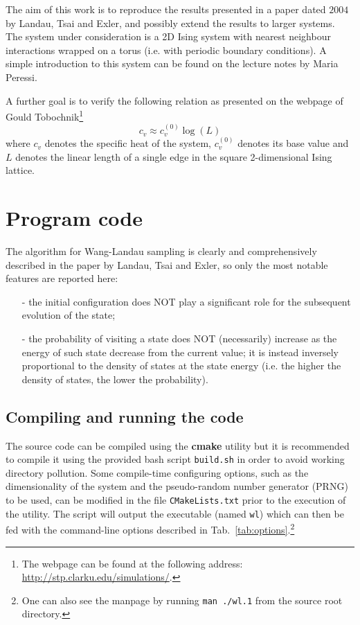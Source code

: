 \documentclass[11pt]{article}
\newcommand{\tabname}{Tab.~}
\begin{document}
The aim of this work is to reproduce the results presented in a paper dated $2004$ by Landau, Tsai and Exler\cite{bib:wang_landau}, and possibly extend the results to larger systems. The system under consideration is a 2D Ising system with nearest neighbour interactions wrapped on a torus (i.e. with periodic boundary conditions). A simple introduction to this system can be found on the lecture notes by Maria Peressi\cite{bib:lect_notes}.

A further goal is to verify the following relation as presented on the webpage of Gould Tobochnik\cite{bib:problem}\footnote{The webpage can be found at the following address: \url{http://stp.clarku.edu/simulations/}.}
\[
	c_v \approx c_v^{(0)}\log{(L)}
\]
where $c_v$ denotes the specific heat of the system, $c_v^{(0)}$ denotes its base value and $L$ denotes the linear length of a single edge in the square 2-dimensional Ising lattice.

\section{Program code}

The algorithm for Wang-Landau sampling is clearly and comprehensively described in the paper by Landau, Tsai and Exler\cite{bib:wang_landau}, so only the most notable features are reported here:
\begin{itemize}
	\item[-] the initial configuration does NOT play a significant role for the subsequent evolution of the state;
	\item[-] the probability of visiting a state does NOT (necessarily) increase as the energy of such state decrease from the current value; it is instead inversely proportional to the density of states at the state energy (i.e. the higher the density of states, the lower the probability).
	
\end{itemize}


\subsection{Compiling and running the code}

The source code can be compiled using the {\bf cmake} utility but it is recommended to compile it using the provided bash script \verb|build.sh| in order to avoid working directory pollution.
Some compile-time configuring options, such as the dimensionality of the system and the pseudo-random number generator (PRNG) to be used, can be modified in the file \verb|CMakeLists.txt| prior to the execution of the utility.
The script will output the executable (named \verb|wl|) which can then be fed with the command-line options described in \tabname \ref{tab:options}.\footnote{One can also see the manpage by running \verb|man ./wl.1| from the source root directory.}
\end{document}

